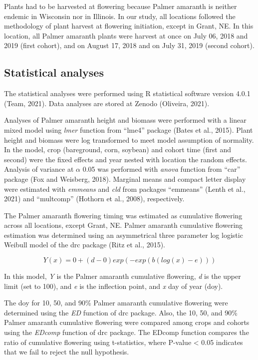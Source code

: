 \documentclass[utf8]{frontiersSCNS}
\begin{document}
Plants had to be harvested at flowering because Palmer amaranth is
neither endemic in Wisconsin nor in Illinois. In our study, all
locations followed the methodology of plant harvest at flowering
initiation, except in Grant, NE. In this location, all Palmer amaranth
plants were harvest at once on July 06, 2018 and 2019 (first cohort),
and on August 17, 2018 and on July 31, 2019 (second cohort).

\hypertarget{statistical-analyses}{%
\subsection*{Statistical analyses}\label{statistical-analyses}}

The statistical analyses were performed using R statistical software
version 4.0.1 (Team, 2021). Data analyses are stored at Zenodo
(Oliveira, 2021).

Analyses of Palmer amaranth height and biomass were performed with a
linear mixed model using \emph{lmer} function from ``lme4'' package
(Bates et al., 2015). Plant height and biomass were log transformed to
meet model assumption of normality. In the model, crop (bareground,
corn, soybean) and cohort time (first and second) were the fixed effects
and year nested with location the random effects. Analysis of variance
at \(\alpha\) 0.05 was performed with \emph{anova} function from ``car''
package (Fox and Weisberg, 2018). Marginal means and compact letter
display were estimated with \emph{emmeans} and \emph{cld} from packages
``emmeans'' (Lenth et al., 2021) and ``multcomp'' (Hothorn et al.,
2008), respectively.

The Palmer amaranth flowering timing was estimated as cumulative
flowering across all locations, except Grant, NE. Palmer amaranth
cumulative flowering estimation was determined using an asymmetrical
three parameter log logistic Weibull model of the drc package (Ritz et
al., 2015).

\[Y(x) = 0 + (d-0) exp (-exp(b(log(x)-e)))\]

In this model, \emph{Y} is the Palmer amaranth cumulative flowering,
\emph{d} is the upper limit (set to 100), and \emph{e} is the inflection
point, and \emph{x} day of year (doy).

The doy for 10, 50, and 90\% Palmer amaranth cumulative flowering were
determined using the \emph{ED} function of drc package. Also, the 10,
50, and 90\% Palmer amaranth cumulative flowering were compared among
crops and cohorts using the \emph{EDcomp} function of drc package. The
EDcomp function compares the ratio of cumulative flowering using
t-statistics, where P-value \textless{} 0.05 indicates that we fail to
reject the null hypothesis.
\end{document}
